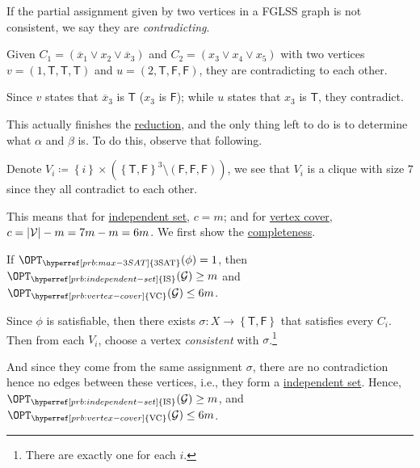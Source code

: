 \begin{notation}[Contradiction]
	If the partial assignment given by two vertices in a FGLSS graph is not consistent, we say they are \emph{contradicting}.
\end{notation}
\begin{eg}
	Given \(C_1=(\overline{x}_1 \lor x_2 \lor \overline{x}_3)\) and \(C_2 = (x_3\lor x_4\lor x_5)\) with two vertices \(v=(1, \textsf{T}, \textsf{T}, \textsf{T})\) and \(u=(2, \textsf{T}, \textsf{F}, \textsf{F})\), they are contradicting to each other.
\end{eg}
\begin{explanation}
	Since \(v\) states that \(\overline{x}_3\) is \(\textsf{T}\) (\(x_3\) is \(\textsf{F}\)); while \(u\) states that \(x_3\) is \(\textsf{T}\), they contradict.
\end{explanation}

This actually finishes the \hyperref[def:reduction]{reduction}, and the only thing left to do is to determine what \(\alpha \) and \(\beta \) is. To do this, observe that following.
\begin{remark}
	Denote \(V_i \coloneqq \left\{ i \right\} \times \left( \left\{ \textsf{T}, \textsf{F} \right\} ^3 \setminus (\textsf{F}, \textsf{F}, \textsf{F}) \right)\), we see that \(V_i\) is a clique with size \(7\) since they all contradict to each other.
\end{remark}

This means that for \hyperref[prb:independent-set]{independent set}, \(c = m\); and for \hyperref[prb:vertex-cover]{vertex cover}, \(c = \vert \mathcal{\MakeUppercase{v}}  \vert - m = 7m - m = 6m\). We first show the \hyperref[def:completeness]{completeness}.

\begin{claim}
	If \(\OPT_{\hyperref[prb:max-3SAT]{\text{3SAT}}} (\phi) = 1\), then \(\OPT_{\hyperref[prb:independent-set]{\text{IS}} }(\mathcal{\MakeUppercase{g}} ) \geq m\) and \(\OPT_{\hyperref[prb:vertex-cover]{\text{VC}} }(\mathcal{\MakeUppercase{g}} ) \leq 6m\).
\end{claim}
\begin{explanation}
	Since \(\phi \) is satisfiable, then there exists \(\sigma \colon X \to \left\{ \textsf{T}, \textsf{F} \right\} \) that satisfies every \(C_i\). Then from each \(V_i\), choose a vertex \emph{consistent} with \(\sigma \).\footnote{There are exactly one for each \(i\).}

	And since they come from the same assignment \(\sigma \), there are no contradiction hence no edges between these vertices, i.e., they form a \hyperref[prb:independent-set]{independent set}. Hence, \(\OPT_{\hyperref[prb:independent-set]{\text{IS}} }(\mathcal{\MakeUppercase{g}} ) \geq m\), and \(\OPT_{\hyperref[prb:vertex-cover]{\text{VC}} }(\mathcal{\MakeUppercase{g}} ) \leq 6m\).
\end{explanation}

